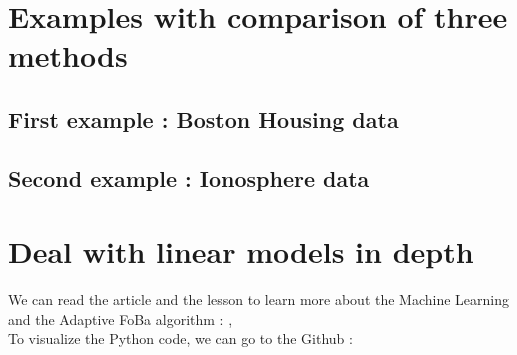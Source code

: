 \documentclass{article}
\begin{document}

\section{Examples with comparison of three methods}
\subsection{First example : Boston Housing data}

\subsection{Second example : Ionosphere data}

\section{Deal with linear models in depth}
\label{sec:pour_aller_plus_loin_sur_ce_theme}

We can read the article and the lesson to learn more about the Machine Learning and the Adaptive FoBa algorithm :
\cite{Article}, \cite{Teaching}\\
To visualize the Python code, we can go to the Github :
\cite{code}




\end{document}

